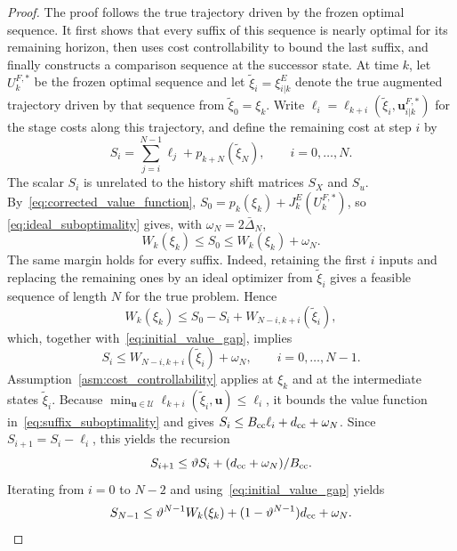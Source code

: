 \documentclass[journal]{IEEEtran}
\newcommand{\vu}{\mathbf{u}}
\theoremstyle{plain}
\theoremstyle{definition}
\theoremstyle{definition}
\begin{document}
\begin{proof}
The proof follows the true trajectory driven by the frozen optimal
sequence. It first shows that every suffix of this sequence is nearly
optimal for its remaining horizon, then uses cost controllability to
bound the last suffix, and finally constructs a comparison sequence at
the successor state. At time $k$, let $U_k^{F,*}$ be the frozen optimal
sequence and let $\widetilde\xi_i=\xi_{i|k}^{E}$ denote the true
augmented trajectory driven by that sequence from
$\widetilde\xi_0=\xi_k$. Write
$\ell_i=\ell_{k+i}(\widetilde\xi_i,\vu_{i|k}^{F,*})$ for the stage
costs along this trajectory, and define the remaining cost at step $i$
by
\begin{equation}
S_i=\sum_{j=i}^{N-1}\ell_j+p_{k+N}(\widetilde\xi_N),
\qquad i=0,\ldots,N.
\label{eq:remaining_cost}
\end{equation}
The scalar $S_i$ is unrelated to the history shift matrices $S_X$ and
$S_u$. By~\eqref{eq:corrected_value_function},
$S_0=p_k(\xi_k)+J_k^E(U_k^{F,*})$, so
\eqref{eq:ideal_suboptimality} gives, with $\omega_N=2\bar\Delta_N$,
\begin{equation}
W_k(\xi_k)\le S_0\le W_k(\xi_k)+\omega_N.
\label{eq:initial_value_gap}
\end{equation}
The same margin holds for every suffix. Indeed, retaining the first
$i$ inputs and replacing the remaining ones by an ideal optimizer
from $\widetilde\xi_i$ gives a feasible sequence of length $N$ for the
true problem. Hence
\begin{equation*}
W_k(\xi_k)\le S_0-S_i+W_{N-i,k+i}(\widetilde\xi_i),
\end{equation*}
which, together with~\eqref{eq:initial_value_gap}, implies
\begin{equation}
S_i\le W_{N-i,k+i}(\widetilde\xi_i)+\omega_N,
\qquad i=0,\ldots,N-1.
\label{eq:suffix_suboptimality}
\end{equation}
Assumption~\ref{asm:cost_controllability} applies at $\xi_k$ and at
the intermediate states $\widetilde\xi_i$. Because
$\min_{\vu\in\mathcal U}\ell_{k+i}(\widetilde\xi_i,\vu)\le\ell_i$,
it bounds the value function in~\eqref{eq:suffix_suboptimality} and
gives $S_i\le B_{\rm cc}\ell_i+d_{\rm cc}+\omega_N$. Since
$S_{i+1}=S_i-\ell_i$, this yields the recursion
\begin{equation*}
S_{i+1}\le\vartheta S_i+(d_{\rm cc}+\omega_N)/B_{\rm cc}.
\end{equation*}
Iterating from $i=0$ to $N-2$ and using~\eqref{eq:initial_value_gap}
yields
\begin{equation}
S_{N-1}\le\vartheta^{N-1}W_k(\xi_k)
+(1-\vartheta^{N-1})d_{\rm cc}+\omega_N.
\label{eq:last_suffix_bound}
\end{equation}


\end{proof}
\end{document}
